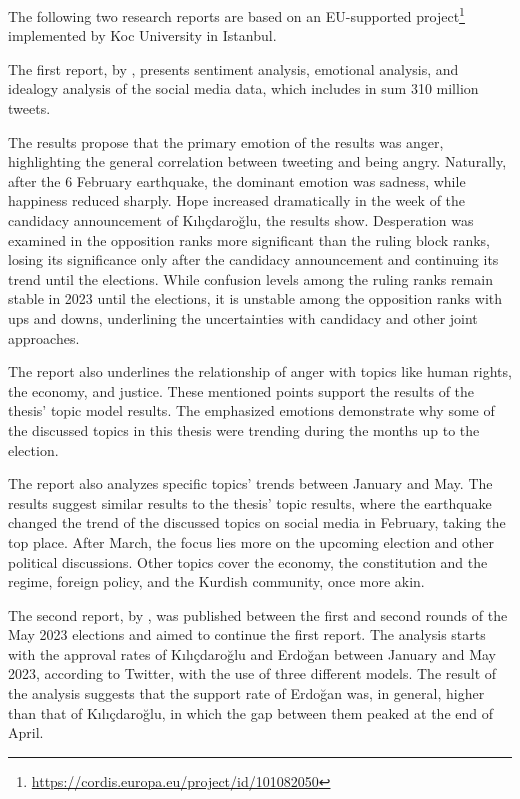 The following two research reports are based on an EU-supported 
project\footnote{\url{https://cordis.europa.eu/project/id/101082050}} implemented by Koc University 
in Istanbul.

The first report, by \textcite{politusanalytics_1_2023}, presents sentiment analysis, emotional analysis, 
and idealogy analysis of the social media data, which includes in sum 310 million tweets. 

The results propose that the primary emotion of the results was anger, highlighting the general 
correlation between tweeting and being angry. Naturally, after the 6 February earthquake, the 
dominant emotion was sadness, while happiness reduced sharply. Hope increased dramatically in the 
week of the candidacy announcement of Kılıçdaroğlu, the results show. Desperation was examined in 
the opposition ranks more significant than the ruling block ranks, losing its significance only 
after the candidacy announcement and continuing its trend until the elections. While confusion 
levels among the ruling ranks remain stable in 2023 until the elections, it is unstable among the
opposition ranks with ups and downs, underlining the uncertainties with candidacy and other joint 
approaches. 

The report also underlines the relationship of anger with topics like human rights, the economy, 
and justice. These mentioned points support the results of the thesis' topic model results. 
The emphasized emotions demonstrate why some of the discussed topics in this thesis were trending 
during the months up to the election.

The report also analyzes specific topics' trends between January and May. The results suggest 
similar results to the thesis' topic results, where the earthquake changed the trend of the 
discussed topics on social media in February, taking the top place. After March, the focus lies 
more on the upcoming election and other political discussions. Other topics cover the economy, 
the constitution and the regime, foreign policy, and the Kurdish community, once more akin.

The second report, by \textcite{politusanalytics_2_2023}, was published between the first and 
second rounds of the May 2023 elections and aimed to continue the first report. The analysis 
starts with the approval rates of Kılıçdaroğlu and Erdoğan between January and May 2023, according 
to Twitter, with the use of three different models. The result of the analysis suggests that the 
support rate of Erdoğan was, in general, higher than that of Kılıçdaroğlu, in which the gap between 
them peaked at the end of April.

